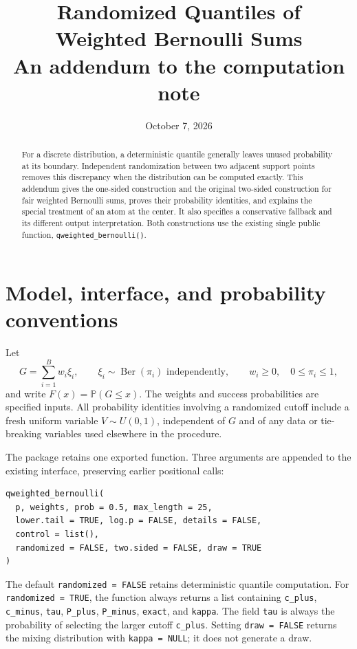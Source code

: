 \documentclass[11pt,letterpaper]{article}
\title{\vspace{-1.1em}\textbf{Randomized Quantiles of\\Weighted Bernoulli Sums}\\[0.4em]
  \large An addendum to the computation note}
\author{}
\date{October 7, 2026}
\newcommand{\Pbb}{\mathbb P}
\begin{document}
\maketitle
\vspace{-1.5em}
\begin{abstract}
For a discrete distribution, a deterministic quantile generally leaves
unused probability at its boundary. Independent randomization between two
adjacent support points removes this discrepancy when the distribution can
be computed exactly. This addendum gives the one-sided construction and the
original two-sided construction for fair weighted Bernoulli sums, proves
their probability identities, and explains the special treatment of an atom
at the center. It also specifies a conservative fallback and its different
output interpretation. Both constructions use the existing single public
function, \texttt{qweighted\_bernoulli()}.
\end{abstract}

\section{Model, interface, and probability conventions}

Let
\[
G=\sum_{i=1}^{B}w_i\xi_i,\qquad
\xi_i\sim\operatorname{Ber}(\pi_i)\text{ independently},\qquad
w_i\ge0,\quad 0\le\pi_i\le1,
\]
and write $F(x)=\Pbb(G\le x)$. The weights and success probabilities are
specified inputs. All probability identities involving a randomized cutoff
include a fresh uniform variable $V\sim U(0,1)$, independent of $G$ and of
any data or tie-breaking variables used elsewhere in the procedure.

The package retains one exported function. Three arguments are appended to
the existing interface, preserving earlier positional calls:
\begin{lstlisting}
qweighted_bernoulli(
  p, weights, prob = 0.5, max_length = 25,
  lower.tail = TRUE, log.p = FALSE, details = FALSE,
  control = list(),
  randomized = FALSE, two.sided = FALSE, draw = TRUE
)
\end{lstlisting}
The default \texttt{randomized = FALSE} retains deterministic quantile
computation. For \texttt{randomized = TRUE}, the function always returns a
list containing \texttt{c\_plus}, \texttt{c\_minus}, \texttt{tau},
\texttt{P\_plus}, \texttt{P\_minus}, \texttt{exact}, and \texttt{kappa}.
The field \texttt{tau} is always the probability of selecting the larger
cutoff \texttt{c\_plus}. Setting \texttt{draw = FALSE} returns the mixing
distribution with \texttt{kappa = NULL}; it does not generate a draw.
\end{document}
